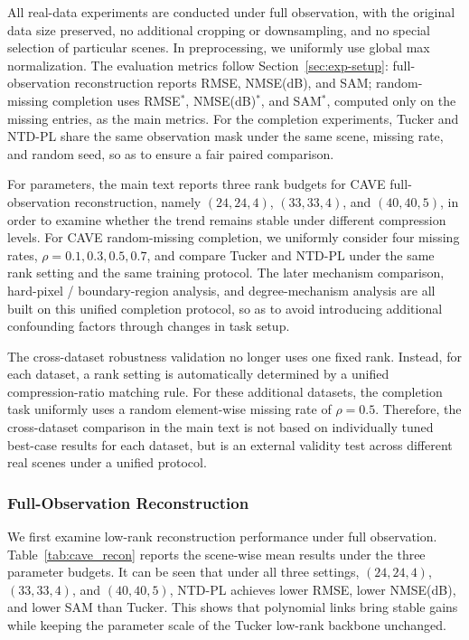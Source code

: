 All real-data experiments are conducted under full observation, with the original data size preserved, no additional cropping or downsampling, and no special selection of particular scenes. In preprocessing, we uniformly use global max normalization. The evaluation metrics follow Section~\ref{sec:exp-setup}: full-observation reconstruction reports RMSE, NMSE(dB), and SAM; random-missing completion uses RMSE$^\ast$, NMSE(dB)$^\ast$, and SAM$^\ast$, computed only on the missing entries, as the main metrics. For the completion experiments, Tucker and NTD-PL share the same observation mask under the same scene, missing rate, and random seed, so as to ensure a fair paired comparison.

For parameters, the main text reports three rank budgets for CAVE full-observation reconstruction, namely $(24,24,4)$, $(33,33,4)$, and $(40,40,5)$, in order to examine whether the trend remains stable under different compression levels. For CAVE random-missing completion, we uniformly consider four missing rates, $\rho=0.1,0.3,0.5,0.7$, and compare Tucker and NTD-PL under the same rank setting and the same training protocol. The later mechanism comparison, hard-pixel / boundary-region analysis, and degree-mechanism analysis are all built on this unified completion protocol, so as to avoid introducing additional confounding factors through changes in task setup.

The cross-dataset robustness validation no longer uses one fixed rank. Instead, for each dataset, a rank setting is automatically determined by a unified compression-ratio matching rule. For these additional datasets, the completion task uniformly uses a random element-wise missing rate of $\rho=0.5$. Therefore, the cross-dataset comparison in the main text is not based on individually tuned best-case results for each dataset, but is an external validity test across different real scenes under a unified protocol.

\subsubsection{Full-Observation Reconstruction}

We first examine low-rank reconstruction performance under full observation. Table~\ref{tab:cave_recon} reports the scene-wise mean results under the three parameter budgets. It can be seen that under all three settings, $(24,24,4)$, $(33,33,4)$, and $(40,40,5)$, NTD-PL achieves lower RMSE, lower NMSE(dB), and lower SAM than Tucker. This shows that polynomial links bring stable gains while keeping the parameter scale of the Tucker low-rank backbone unchanged.

